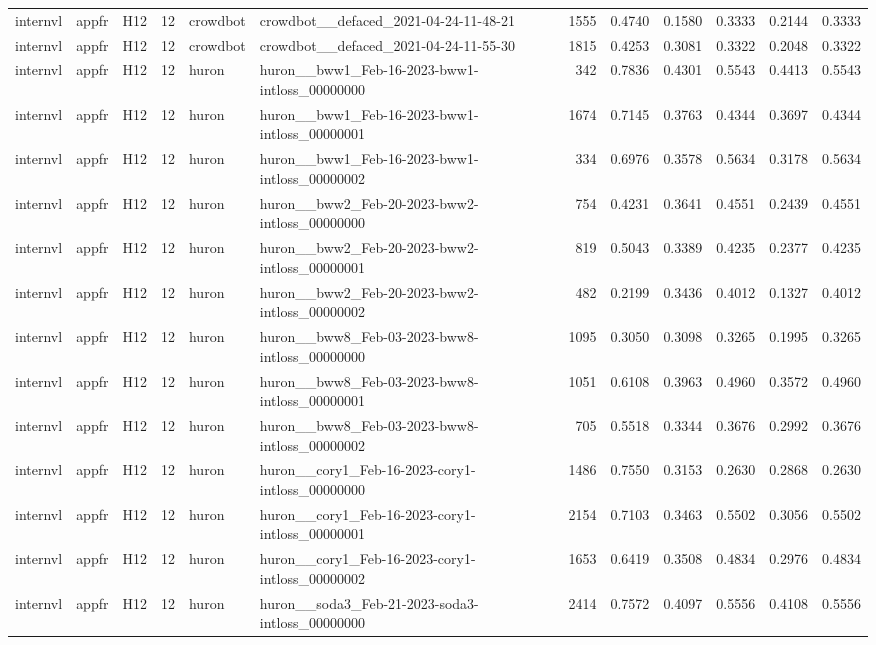\begin{table}[tbp]
\begin{tabular}{lllrllrrrrrr}
internvl & appfr & H12 & 12 & crowdbot & crowdbot\_\_defaced\_2021-04-24-11-48-21 & 1555 & 0.4740 & 0.1580 & 0.3333 & 0.2144 & 0.3333 \\
internvl & appfr & H12 & 12 & crowdbot & crowdbot\_\_defaced\_2021-04-24-11-55-30 & 1815 & 0.4253 & 0.3081 & 0.3322 & 0.2048 & 0.3322 \\
internvl & appfr & H12 & 12 & huron & huron\_\_bww1\_Feb-16-2023-bww1-intloss\_00000000 & 342 & 0.7836 & 0.4301 & 0.5543 & 0.4413 & 0.5543 \\
internvl & appfr & H12 & 12 & huron & huron\_\_bww1\_Feb-16-2023-bww1-intloss\_00000001 & 1674 & 0.7145 & 0.3763 & 0.4344 & 0.3697 & 0.4344 \\
internvl & appfr & H12 & 12 & huron & huron\_\_bww1\_Feb-16-2023-bww1-intloss\_00000002 & 334 & 0.6976 & 0.3578 & 0.5634 & 0.3178 & 0.5634 \\
internvl & appfr & H12 & 12 & huron & huron\_\_bww2\_Feb-20-2023-bww2-intloss\_00000000 & 754 & 0.4231 & 0.3641 & 0.4551 & 0.2439 & 0.4551 \\
internvl & appfr & H12 & 12 & huron & huron\_\_bww2\_Feb-20-2023-bww2-intloss\_00000001 & 819 & 0.5043 & 0.3389 & 0.4235 & 0.2377 & 0.4235 \\
internvl & appfr & H12 & 12 & huron & huron\_\_bww2\_Feb-20-2023-bww2-intloss\_00000002 & 482 & 0.2199 & 0.3436 & 0.4012 & 0.1327 & 0.4012 \\
internvl & appfr & H12 & 12 & huron & huron\_\_bww8\_Feb-03-2023-bww8-intloss\_00000000 & 1095 & 0.3050 & 0.3098 & 0.3265 & 0.1995 & 0.3265 \\
internvl & appfr & H12 & 12 & huron & huron\_\_bww8\_Feb-03-2023-bww8-intloss\_00000001 & 1051 & 0.6108 & 0.3963 & 0.4960 & 0.3572 & 0.4960 \\
internvl & appfr & H12 & 12 & huron & huron\_\_bww8\_Feb-03-2023-bww8-intloss\_00000002 & 705 & 0.5518 & 0.3344 & 0.3676 & 0.2992 & 0.3676 \\
internvl & appfr & H12 & 12 & huron & huron\_\_cory1\_Feb-16-2023-cory1-intloss\_00000000 & 1486 & 0.7550 & 0.3153 & 0.2630 & 0.2868 & 0.2630 \\
internvl & appfr & H12 & 12 & huron & huron\_\_cory1\_Feb-16-2023-cory1-intloss\_00000001 & 2154 & 0.7103 & 0.3463 & 0.5502 & 0.3056 & 0.5502 \\
internvl & appfr & H12 & 12 & huron & huron\_\_cory1\_Feb-16-2023-cory1-intloss\_00000002 & 1653 & 0.6419 & 0.3508 & 0.4834 & 0.2976 & 0.4834 \\
internvl & appfr & H12 & 12 & huron & huron\_\_soda3\_Feb-21-2023-soda3-intloss\_00000000 & 2414 & 0.7572 & 0.4097 & 0.5556 & 0.4108 & 0.5556 \\

\end{tabular}
\end{table}
